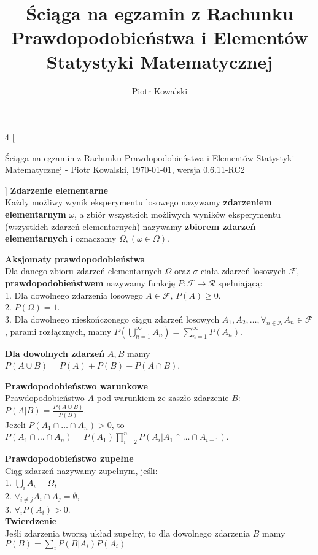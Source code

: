 \documentclass[10pt,landscape,a4paper,notitlepage]{article}
\author{Piotr Kowalski}
\title{Ściąga na egzamin z Rachunku Prawdopodobieństwa i Elementów Statystyki Matematycznej}
\begin{document}
    \begin{multicols*}{4}
        [
        \begin{center}
            Ściąga na egzamin z Rachunku Prawdopodobieństwa i Elementów Statystyki Matematycznej - Piotr Kowalski, \today , wersja 0.6.11-RC2
        \end{center}
        ]
        \noindent\textbf{\large Zdarzenie elementarne}\\
        Każdy możliwy wynik eksperymentu losowego nazywamy \textbf{zdarzeniem elementarnym} $\omega$, a zbiór wszystkich możliwych wyników eksperymentu (wszystkich zdarzeń elementarnych) nazywamy \textbf{zbiorem zdarzeń elementarnych} i oznaczamy $\Omega, (\omega\in\Omega)$.
        
        \noindent\textbf{\large Aksjomaty prawdopodobieństwa}\\
        Dla danego zbioru zdarzeń elementarnych $\Omega$ oraz $\sigma$-ciała zdarzeń losowych $\mathcal{F}$, \textbf{prawdopodobieństwem} nazywamy funkcję $P:\mathcal{F}\rightarrow \mathcal{R}$ spełniającą:\\
        1. Dla dowolnego zdarzenia losowego $A\in\mathcal{F}$, $P(A)\geq 0$.\\
        2. $P(\Omega)=1$.\\
        3. Dla dowolnego nieskończonego ciągu zdarzeń losowych $A_1, A_2, \ldots, \forall_{n\in\mathcal{N}} A_n\in\mathcal{F}$, parami rozłącznych, mamy $P\left(\bigcup^\infty_{n=1}A_n\right)=\sum^\infty_{n=1}P(A_n)$.

        \noindent \textbf{Dla dowolnych zdarzeń} $A, B$ mamy\\ $P(A\cup B)=P(A)+P(B)-P(A\cap B)$.

        \noindent \textbf{\large Prawdopodobieństwo warunkowe}\\
        Prawdopodobieństwo $A$ pod warunkiem że zaszło zdarzenie $B$: $P(A|B)=\frac{P(A\cup B)}{P(B)}$.\\
        Jeżeli $P(A_1\cap \ldots \cap A_n)>0$, to $P(A_1\cap \ldots \cap A_n) = P(A_1)\prod_{i=2}^nP(A_i|A_1 \cap\ldots\cap A_{i-1})$.

        \noindent \textbf{\large Prawdopodobieństwo zupełne}\\
        Ciąg zdarzeń nazywamy zupełnym, jeśli:\\
        1. $\bigcup_i A_i = \Omega$,\\
        2. $\forall_{i\neq j}A_i \cap A_j = \emptyset$,\\
        3. $\forall_i P(A_i)>0$.\\
        \textbf{Twierdzenie}\\
        Jeśli zdarzenia tworzą układ zupełny, to dla dowolnego zdarzenia $B$ mamy $P(B)=\sum_iP(B|A_i)P(A_i)$


\end{multicols*}
\end{document}
